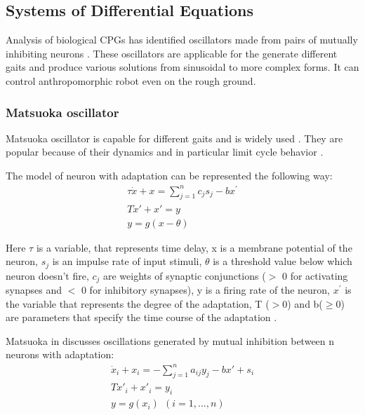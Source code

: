 \documentclass[12pt,a4paper]{report}
\begin{document}
		\subsection{Systems of Differential Equations}
			Analysis of biological CPGs has identified oscillators made from pairs of mutually inhibiting neurons \cite{grillner1995neural}. These oscillators are applicable for the  generate different gaits and produce various solutions from sinusoidal to more complex forms. It can control anthropomorphic robot  even on the rough ground.
			\subsubsection{Matsuoka oscillator}
				Matsuoka oscillator is capable for different gaits and is widely used \cite{wright2014intelligent}. They are popular because of their dynamics and in particular limit cycle behavior \cite{matsuoka1985sustained}.
				
				The model of neuron with adaptation can be represented the following way:
				\begin{equation}\label{eq:Mats1}
					\begin{split}
						\tau \dot{x} + x = \sum^n_{j = 1} c_j s_j - b x^{\prime}\\
						T \dot{x} \prime  + x \prime = y\\
						y = g(x - \theta)
					\end{split}
				\end{equation}
				
				Here $\tau$ is a variable, that represents time delay, x is a membrane potential of the neuron, $s_j$ is an impulse rate of input stimuli, $\theta$ is a threshold value below which neuron doesn't fire, $c_j$ are weights of synaptic conjunctions ($>$ 0 for activating synapses and $<$ 0 for inhibitory synapses), y is a firing rate of the neuron, $x^{\prime}$ is the variable that represents the degree of the adaptation, T ($>$0) and b($\geq 0$) are parameters that specify the time course of the adaptation \cite{matsuoka1985sustained}.
				
				Matsuoka in \cite{matsuoka1985sustained} discusses oscillations generated by mutual inhibition between n neurons with adaptation:
				\begin{equation}\label{eq:Mats2}
					\begin{split}
						\dot{x}_i + x_i = - \sum^n_{j = 1} a_{ij} y_j - b x \prime + s_i\\
						T \dot{x} \prime _i  + x \prime _i= y_i\\
						y = g(x_i)\ \ (i = 1,...,n) 
					\end{split}
				\end{equation}
				
\end{document}
